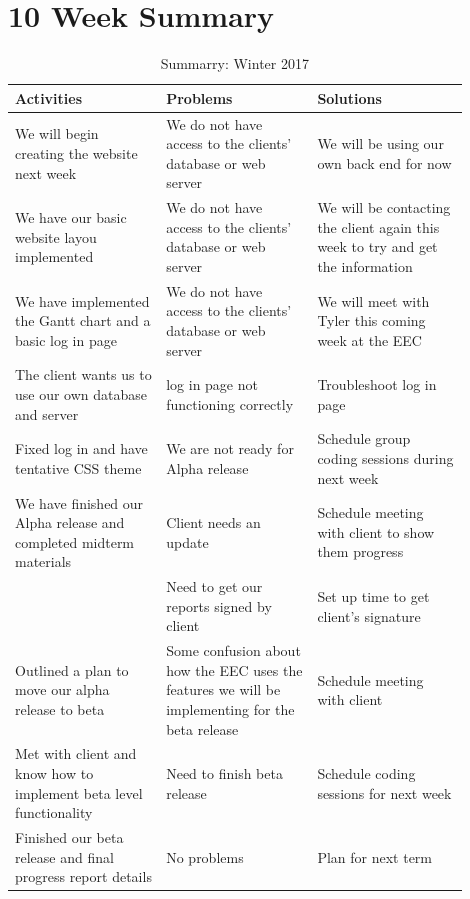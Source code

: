 \documentclass[letterpaper,10pt,titlepage,journal,compsoc,draftclsnofoot,onecolumn]{IEEEtran}
\begin{document}
\section{10 Week Summary}

\begin{table}[H]
			\caption{Summarry: Winter 2017}
			\begin{center}
				\begin{tabular}{| p{0.3\linewidth} | p{0.3\linewidth} | p{0.3\linewidth} | }
					\hline
					 \textbf{Activities} & \textbf{Problems} & \textbf{Solutions} \\ [0.5ex]
					\hline
					We will begin creating the website next week & We do not have access to the clients' database or web server & We will be using our own back end for now  \\
					\hline
					 We have our basic website layou implemented  & We do not have access to the clients' database or web server & We will be contacting the client again this week to try and get the information \\
					\hline
					 We have implemented the Gantt chart and a basic log in page & We do not have access to the clients' database or web server & We will meet with Tyler this coming week at the EEC\\
					\hline
					The client wants us to use our own database and server & log in page not functioning correctly & Troubleshoot log in page\\
					\hline
					Fixed log in and have tentative CSS theme & We are not ready for Alpha release & Schedule group coding sessions during next week\\
					\hline
					We have finished our Alpha release and completed midterm materials & Client needs an update & Schedule meeting with client to show them progress\\
					\hline
					 & Need to get our reports signed by client & Set up time to get client's signature\\
					\hline
					Outlined a plan to move our alpha release to beta & Some confusion about how the EEC uses the features we will be implementing for the beta release & Schedule meeting with client\\
					\hline
					Met with client and know how to implement beta level functionality & Need to finish beta release & Schedule coding sessions for next week\\
					\hline
					Finished our beta release and final progress report details & No problems & Plan for next term\\
					\hline
				\end{tabular}
			\end{center}
			\end{table}
\end{document}
